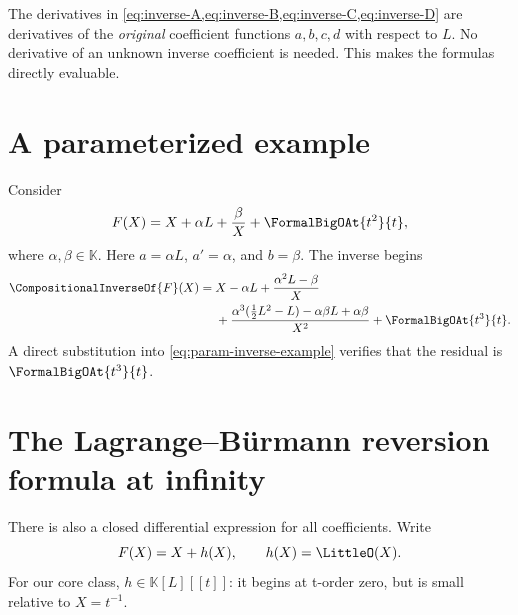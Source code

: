 \documentclass[11pt,openany]{book}
\theoremstyle{definition}
\theoremstyle{plain}
\theoremstyle{remark}
\newcommand{\K}{\mathbb{K}}
\newcommand{\rev}[1]{\CompositionalInverseOf{#1}}
\begin{document}
\begin{checkpointbox}
The derivatives in \cref{eq:inverse-A,eq:inverse-B,eq:inverse-C,eq:inverse-D}
are derivatives of the \emph{original} coefficient functions \(a,b,c,d\) with
respect to \(L\).  No derivative of an unknown inverse coefficient is needed.
This makes the formulas directly evaluable.
\end{checkpointbox}

\section{A parameterized example}
Consider
\begin{equation}\label{eq:param-inverse-example}
 F(X)=X+\alpha L+\frac{\beta}{X}+\FormalBigOAt{t^2}{t},
\end{equation}
where \(\alpha,\beta\in\K\).  Here \(a=\alpha L\), \(a'=\alpha\), and
\(b=\beta\).  The inverse begins
\begin{equation}\label{eq:param-inverse-result}
\begin{split}
 \rev{F}(X)={}&X-\alpha L
 +\frac{\alpha^2L-\beta}{X}\\
 &+\frac{\alpha^3(\tfrac12L^2-L)-\alpha\beta L+\alpha\beta}{X^2}
 +\FormalBigOAt{t^3}{t}.
\end{split}
\end{equation}
A direct substitution into \cref{eq:param-inverse-example} verifies that the
residual is \(\FormalBigOAt{t^3}{t}\).

\section{The Lagrange--Bürmann reversion formula at infinity}
There is also a closed differential expression for all coefficients.  Write
\begin{equation}\label{eq:F-x-plus-h}
 F(X)=X+h(X),
 \qquad h(X)=\LittleO(X).
\end{equation}
For our core class, \(h\in\K[L][[t]]\): it begins at t-order zero, but is small
relative to \(X=t^{-1}\).
\end{document}

